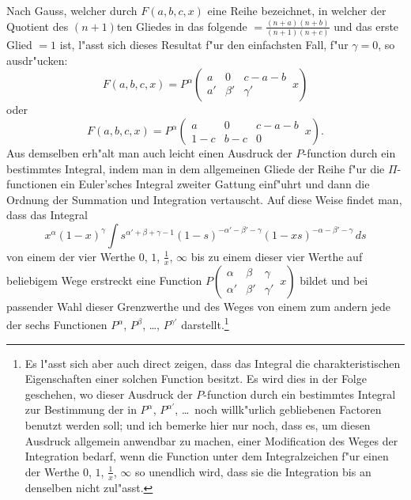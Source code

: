 \documentclass[12pt,a4paper]{article}
\begin{document}
Nach Gauss, welcher durch $F(a, b, c, x)$ eine Reihe bezeichnet, in welcher der Quotient des $(n + 1)$ten Gliedes in das folgende $= \frac{(n + a)(n + b)}{(n + 1)(n + c)}$ und das erste Glied $= 1$ ist, l{"a}sst sich dieses Resultat f{"u}r den einfachsten Fall, f{"u}r $\gamma = 0$, so ausdr{"u}cken:
\[
F(a, b, c, x) = P^{\alpha} \left(\begin{array}{ccc|} a & 0 & c - a - b \\ a' & \beta' & \gamma' \end{array}\, x\right)
\]
oder
\[
F(a, b, c, x) = P^{\alpha} \left(\begin{array}{ccc|} a & 0 & c - a - b \\ 1 - c & b - c & 0 \end{array}\, x\right).
\]
Aus demselben erh{"a}lt man auch leicht einen Ausdruck der $P$-function durch ein bestimmtes Integral, indem man in dem allgemeinen Gliede der Reihe f{"u}r die $\Pi$-functionen ein Euler'sches Integral zweiter Gattung einf{"u}hrt und dann die Ordnung der Summation und Integration vertauscht. Auf diese Weise findet man, dass das Integral
\[
x^{\alpha} (1 - x)^{\gamma} \int s^{\alpha' + \beta + \gamma - 1} (1 - s)^{-\alpha' - \beta' - \gamma} (1 - xs)^{-\alpha - \beta' - \gamma} \, ds
\]
von einem der vier Werthe $0$, $1$, $\frac{1}{x}$, $\infty$ bis zu einem dieser vier Werthe auf beliebigem Wege erstreckt eine Function $P\left(\begin{array}{ccc|} \alpha & \beta & \gamma \\ \alpha' & \beta' & \gamma' \end{array}\, x\right)$ bildet und bei passender Wahl dieser Grenzwerthe und des Weges von einem zum andern jede der sechs Functionen $P^{\alpha}$, $P^{\beta}$, \dots, $P^{\gamma'}$ darstellt.\footnote{Es l{"a}sst sich aber auch direct zeigen, dass das Integral die charakteristischen Eigenschaften einer solchen Function besitzt. Es wird dies in der Folge geschehen, wo dieser Ausdruck der $P$-function durch ein bestimmtes Integral zur Bestimmung der in $P^{\alpha}$, $P^{\alpha'}$, \dots\ noch willk{"u}rlich gebliebenen Factoren benutzt werden soll; und ich bemerke hier nur noch, dass es, um diesen Ausdruck allgemein anwendbar zu machen, einer Modification des Weges der Integration bedarf, wenn die Function unter dem Integralzeichen f{"u}r einen der Werthe $0$, $1$, $\frac{1}{x}$, $\infty$ so unendlich wird, dass sie die Integration bis an denselben nicht zul{"a}sst.}
\end{document}
